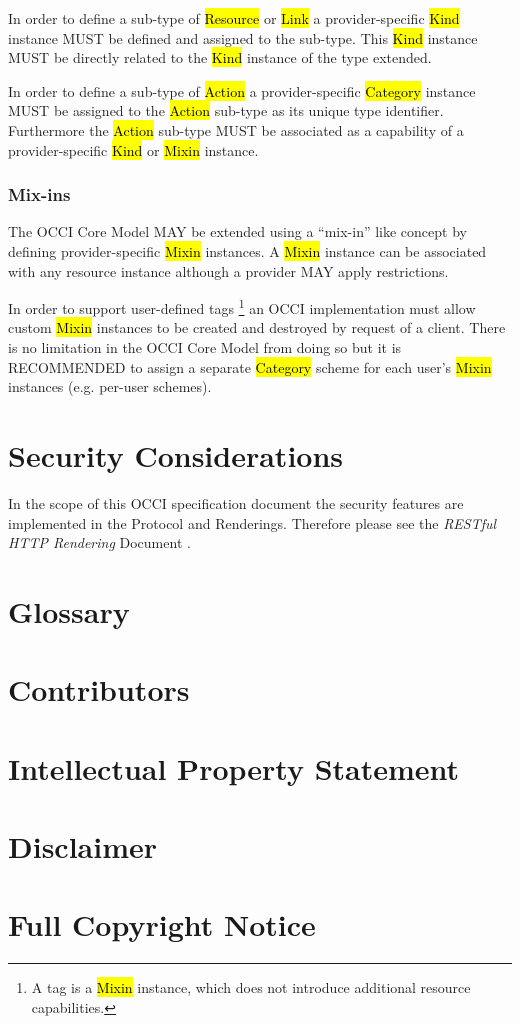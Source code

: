 \documentclass[10pt,a4paper]{article}
\begin{document}
In order to define a sub-type of \hl{Resource} or \hl{Link} a
provider-specific \hl{Kind} instance MUST be defined and assigned to
the sub-type. This \hl{Kind} instance MUST be directly related to the
\hl{Kind} instance of the type extended.

In order to define a sub-type of \hl{Action} a provider-specific
\hl{Category} instance MUST be assigned to the \hl{Action} sub-type as
its unique type identifier.  Furthermore the \hl{Action} sub-type MUST
be associated as a capability of a provider-specific \hl{Kind} or
\hl{Mixin} instance.

\subsubsection{Mix-ins}
The OCCI Core Model MAY be extended using a ``mix-in'' like concept by
defining provider-specific \hl{Mixin} instances.  A \hl{Mixin}
instance can be associated with any resource instance although a
provider MAY apply restrictions.

In order to support user-defined tags \footnote{A tag is a \hl{Mixin}
  instance, which does not introduce additional resource
  capabilities.}  an OCCI implementation must allow custom \hl{Mixin}
instances to be created and destroyed by request of a client.  There
is no limitation in the OCCI Core Model from doing so but it is
RECOMMENDED to assign a separate \hl{Category} scheme for each user's
\hl{Mixin} instances (e.g. per-user schemes).

\section{Security Considerations}
In the scope of this OCCI specification document the security features
are implemented in the Protocol and Renderings. Therefore please see
the \emph{RESTful HTTP Rendering} Document \cite{occi:http_rendering}.

\section{Glossary}
\label{sec:glossary}


\section{Contributors}


\section{Intellectual Property Statement}


\section{Disclaimer}


\section{Full Copyright Notice}




\end{document}
